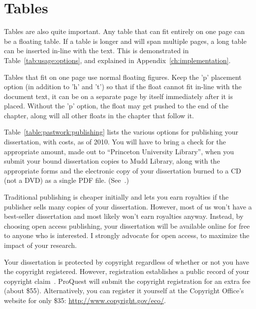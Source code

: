 \section{Tables}
\label{sec:pastwork:tables}

Tables are also quite important. Any table that can fit entirely on one page can be a floating table. If a table is longer and will span multiple pages, a long table can be inserted in-line with the text. This is demonstrated in Table~\ref{tab:usage:options}, and explained in Appendix~\ref{ch:implementation}.

Tables that fit on one page use normal floating figures. Keep the 'p' placement option (in addition to 'h' and 't') so that if the float cannot fit in-line with the document text, it can be on a separate page by itself immediately after it is placed. Without the 'p' option, the float may get pushed to the end of the chapter, along will all other floats in the chapter that follow it.

Table~\ref{table:pastwork:publishing} lists the various options for publishing your dissertation, with costs, as of 2010. You will have to bring a check for the appropriate amount, made out to ``Princeton University Library'', when you submit your bound dissertation copies to Mudd Library, along with the appropriate forms and the electronic copy of your dissertation burned to a CD (not a DVD) as a single PDF file. (See~\cite{muddthesis2009}.)

Traditional publishing is cheaper initially and lets you earn royalties if the publisher sells many copies of your dissertation. However, most of us won't have a best-seller dissertation and most likely won't earn royalties anyway. Instead, by choosing open access publishing, your dissertation will be available online for free to anyone who is interested. I strongly advocate for open access, to maximize the impact of your research.

Your dissertation is protected by copyright regardless of whether or not you have the copyright registered. However, registration establishes a public record of your copyright claim~\cite{muddthesis2009}. ProQuest will submit the copyright registration for an extra fee (about \$55). Alternatively, you can register it yourself at the Copyright Office's website for only \$35: \url{http://www.copyright.gov/eco/}.

